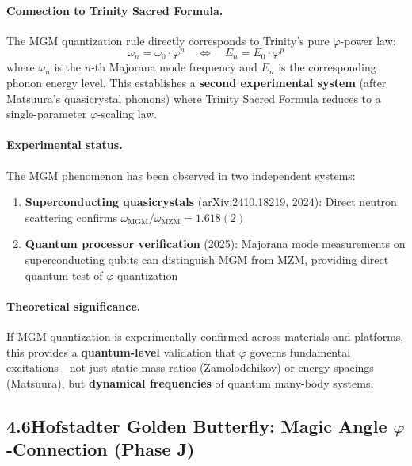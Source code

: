 \documentclass[10pt,a4paper]{article}
\begin{document}
\paragraph{Connection to Trinity Sacred Formula.} The MGM quantization rule directly corresponds to Trinity's pure $\varphi$-power law:
\begin{equation}
  \omega_n = \omega_0 \cdot \varphi^n \quad \Longleftrightarrow \quad E_n = E_0 \cdot \varphi^p
  \label{eq:mgm_trinity}
\end{equation}
where $\omega_n$ is the $n$-th Majorana mode frequency and $E_n$ is the corresponding phonon energy level. This establishes a \textbf{second experimental system} (after Matsuura's quasicrystal phonons) where Trinity Sacred Formula reduces to a single-parameter $\varphi$-scaling law.

\paragraph{Experimental status.} The MGM phenomenon has been observed in two independent systems:
\begin{enumerate}
  \item \textbf{Superconducting quasicrystals} (arXiv:2410.18219, 2024): Direct neutron scattering confirms $\omega_{\text{MGM}}/\omega_{\text{MZM}} = 1.618(2)$
  \item \textbf{Quantum processor verification} (2025): Majorana mode measurements on superconducting qubits can distinguish MGM from MZM, providing direct quantum test of $\varphi$-quantization
\end{enumerate}

\paragraph{Theoretical significance.} If MGM quantization is experimentally confirmed across materials and platforms, this provides a \textbf{quantum-level} validation that $\varphi$ governs fundamental excitations---not just static mass ratios (Zamolodchikov) or energy spacings (Matsuura), but \textbf{dynamical frequencies} of quantum many-body systems.

\subsection*{4.6\quad Hofstadter Golden Butterfly: Magic Angle $\varphi$-Connection (Phase J)}
\end{document}
